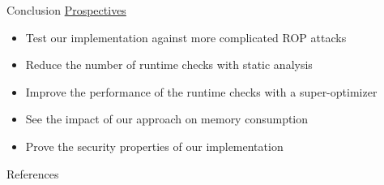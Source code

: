 \documentclass{beamer}
\begin{document}
\begin{frame}[c]{Conclusion}
	\underline{Prospectives}
	\begin{itemize}
		\item Test our implementation against more complicated ROP attacks
		\item Reduce the number of runtime checks with static analysis~\cite{Zeng:2011:CCI:2046707.2046713}
		\item Improve the performance of the runtime checks with a super-optimizer
		\item See the impact of our approach on memory consumption
		\item Prove the security properties of our implementation
	\end{itemize}
\end{frame}

 
\nocite{Leroy:2009:FVR:1538788.1538814}
\nocite{Sehr:2010:ASF:1929820.1929822}
\nocite{Wahbe:1993:ESF:173668.168635}
\nocite{Zeng:2011:CCI:2046707.2046713}

\begin{frame}[noframenumbering]{References}
	\scriptsize
	
    
\end{frame}
\end{document}
